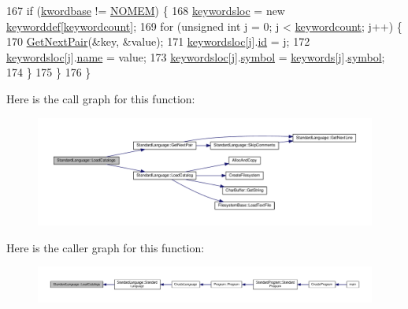 \begin{DoxyCode}
167     \textcolor{keywordflow}{if} (\hyperlink{classStandardLanguage_a02ebeba276a3f355b73533eb8a664673}{kwordbase} != \hyperlink{platform_8h_a46ff2bfbf0d44b8466a2251d5bd5e6f8}{NOMEM}) \{
168         \hyperlink{classLanguage_a14560ed53cf2860b61199d2882c52f67}{keywordsloc} = \textcolor{keyword}{new} \hyperlink{structkeyworddef}{keyworddef}[\hyperlink{classLanguage_ab392fc18ba79a2a47bdde99eec400aa1}{keywordcount}];
169         \textcolor{keywordflow}{for} (\textcolor{keywordtype}{unsigned} \textcolor{keywordtype}{int} j = 0; j < \hyperlink{classLanguage_ab392fc18ba79a2a47bdde99eec400aa1}{keywordcount}; j++) \{
170             \hyperlink{classStandardLanguage_ab1945e2e3503ce12eac28c0d08234cfb}{GetNextPair}(&key, &value);
171             \hyperlink{classLanguage_a14560ed53cf2860b61199d2882c52f67}{keywordsloc}[j].\hyperlink{structkeyworddef_a7f5bc29bae784c5b8af94f858d500be5}{id} = j;
172             \hyperlink{classLanguage_a14560ed53cf2860b61199d2882c52f67}{keywordsloc}[j].\hyperlink{structkeyworddef_a03b3d7dd316565c6fac8786186ec66c2}{name} = value;
173             \hyperlink{classLanguage_a14560ed53cf2860b61199d2882c52f67}{keywordsloc}[j].\hyperlink{structkeyworddef_aec6598e221bbce9e131b30989f7e2cce}{symbol} = \hyperlink{kword_8h_ae24629a120e041e6b687315832fca587}{keywords}[j].\hyperlink{structkeyworddef_aec6598e221bbce9e131b30989f7e2cce}{symbol};
174         \}
175     \}
176 \}
\end{DoxyCode}


Here is the call graph for this function\+:
\nopagebreak
\begin{figure}[H]
\begin{center}
\leavevmode
\includegraphics[width=350pt]{d6/db6/classStandardLanguage_afd0037d341b94b08497842470007e59b_cgraph}
\end{center}
\end{figure}




Here is the caller graph for this function\+:
\nopagebreak
\begin{figure}[H]
\begin{center}
\leavevmode
\includegraphics[width=350pt]{d6/db6/classStandardLanguage_afd0037d341b94b08497842470007e59b_icgraph}
\end{center}
\end{figure}


